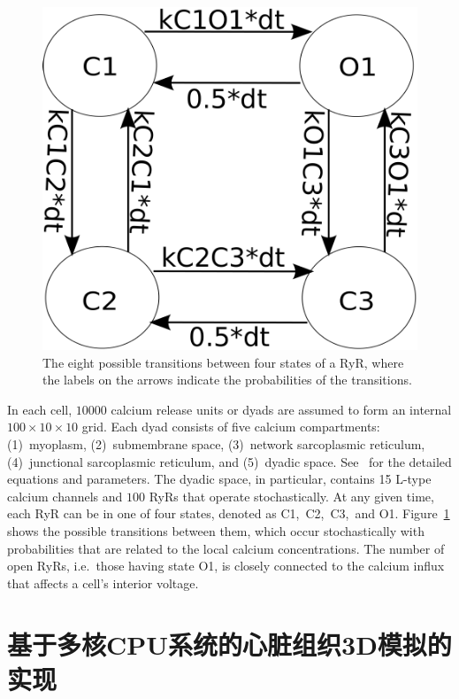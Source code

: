  \begin{figure}[ht]
\center
\includegraphics[scale=0.5]{figs/state.pdf}
\caption{The eight possible transitions between four states of a RyR, where the labels on the arrows indicate the
probabilities of the transitions.}
\label{ryrstates}
\end{figure}

In each cell, $10000$ calcium release units or dyads
are assumed to form an internal $100\times 10\times 10$ grid. Each dyad consists of five calcium compartments: (1)~myoplasm, (2)~submembrane space, (3)~network sarcoplasmic reticulum, (4)~junctional sarcoplasmic reticulum, and (5)~dyadic space.
See~\cite{gaur2011multiscale} for the detailed
equations and parameters. The
dyadic space, in particular, contains 15 L-type calcium channels and $100$ RyRs
that operate stochastically. At any given time, each RyR can be in one
of four states, denoted as  C1,~C2,~C3,~and O1.
Figure~\ref{ryrstates} shows the possible transitions between
them, which occur stochastically with probabilities that are related
to the local calcium concentrations. The number of open RyRs,
i.e.~those having state O1, is closely connected to the
calcium influx that affects a cell's interior voltage. 


\section{基于多核CPU系统的心脏组织3D模拟的实现}

